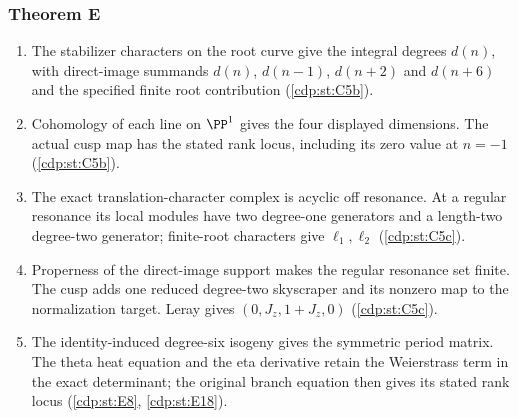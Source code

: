 \subsubsection*{Theorem E}
\begin{enumerate}[label=\arabic*.,leftmargin=*]
\item\hypertarget{step-II-E-1}{} The stabilizer characters on the
root curve give the integral degrees $d(n)$, with direct-image
summands $d(n)$, $d(n-1)$, $d(n+2)$ and $d(n+6)$ and the
specified finite root contribution
(\hyperref[cdp:st:C5b]{\ref*{cdp:st:C5b}}).
\item\hypertarget{step-II-E-2}{} Cohomology of each line on
$\PP^1$ gives the four displayed dimensions. The actual cusp
map has the stated rank locus, including its zero value at
$n=-1$ (\hyperref[cdp:st:C5b]{\ref*{cdp:st:C5b}}).
\item\hypertarget{step-II-E-3}{} The exact translation-character
complex is acyclic off resonance. At a regular resonance its
local modules have two degree-one generators and a length-two
degree-two generator; finite-root characters give
$\ell_1,\ell_2$ (\hyperref[cdp:st:C5c]{\ref*{cdp:st:C5c}}).
\item\hypertarget{step-II-E-4}{} Properness of the direct-image
support makes the regular resonance set finite. The cusp adds
one reduced degree-two skyscraper and its nonzero map to the
normalization target. Leray gives $(0,J_z,1+J_z,0)$
(\hyperref[cdp:st:C5c]{\ref*{cdp:st:C5c}}).
\item\hypertarget{step-II-E-5}{} The identity-induced degree-six
isogeny gives the symmetric period matrix. The theta heat equation
and the eta derivative retain the Weierstrass term in the exact
determinant; the original branch equation then gives its stated
rank locus (\hyperref[cdp:st:E8]{\ref*{cdp:st:E8}},
\hyperref[cdp:st:E18]{\ref*{cdp:st:E18}}).
\end{enumerate}

\hypertarget{outline-II-F}{}
